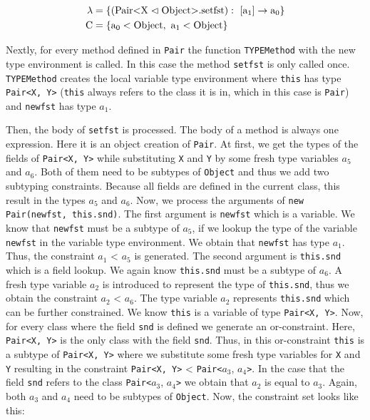 \begin{align*}
    \lambda &= \{ ( \text{Pair} \text{<} \text{X} \vartriangleleft \text{Object} \text{>}. \text{setfst} ): \ [\text{a}_1] \to \text{a}_0 \}\\
    \text{C} &= \{ \text{a}_0 < \text{Object}, \ \text{a}_1 < \text{Object} \}\\
\end{align*}

Nextly, for every method defined in \verb|Pair| the function \verb|TYPEMethod| with the new type environment is called.
In this case the method \verb|setfst| is only called once. \verb|TYPEMethod| creates the local variable type environment where \verb|this| has type \verb|Pair<X, Y>| (\verb|this| always refers to the class it is in, which in this case is \verb|Pair|) and \verb|newfst| has type $a_1$.

Then, the body of \verb|setfst| is processed. The body of a method is always one expression. Here it is an object creation of \verb|Pair|.
At first, we get the types of the fields of \verb|Pair<X, Y>| while substituting \verb|X| and \verb|Y| by some fresh type variables $a_5$ and $a_6$. Both of them need to be subtypes of \verb|Object| and thus we add two subtyping constraints. Because all fields are defined in the current class, this result in the types $a_5$ and $a_6$. Now, we process the arguments of \verb|new Pair(newfst, this.snd)|.
The first argument is \verb|newfst| which is a variable. We know that \verb|newfst| must be a subtype of $a_5$, if we lookup the type of the variable \verb|newfst| in the variable type environment. We obtain that \verb|newfst| has type $a_1$. Thus, the constraint $a_1$ < $a_5$ is generated.
The second argument is \verb|this.snd| which is a field lookup. We again know \verb|this.snd| must be a subtype of $a_6$. A fresh type variable $a_2$ is introduced to represent the type of \verb|this.snd|, thus we obtain the constraint $a_2$ < $a_6$.
The type variable $a_2$ represents \verb|this.snd| which can be further constrained. We know \verb|this| is a variable of type \verb|Pair<X, Y>|.
Now, for every class where the field \verb|snd| is defined we generate an or-constraint. Here, \verb|Pair<X, Y>| is the only class with the field \verb|snd|. Thus, in this or-constraint \verb|this| is a subtype of \verb|Pair<X, Y>| where we substitute some fresh type variables for \verb|X| and \verb|Y| resulting in the constraint \verb|Pair<X, Y>| < \verb|Pair<|$a_3$, $a_4$\verb|>|.
In the case that the field \verb|snd| refers to the class \verb|Pair<|$a_3$, $a_4$\verb|>| we obtain that $a_2$ is equal to $a_3$. Again, both $a_3$ and $a_4$ need to be subtypes of \verb|Object|.
Now, the constraint set looks like this:

